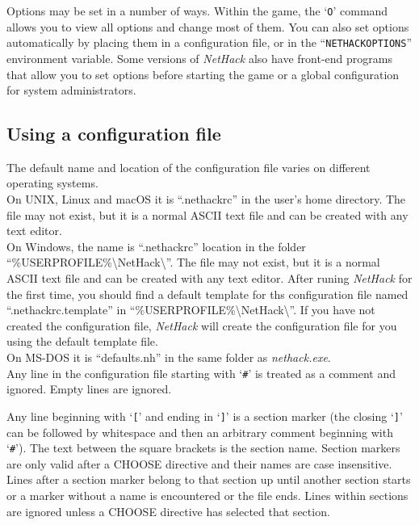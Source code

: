 Options may be set in a number of ways.  Within the game, the `{\tt O}'
command allows you to view all options and change most of them.
You can also set options automatically by placing them in a configuration
file, or in the ``{\tt NETHACKOPTIONS}'' environment variable.
Some versions of {\it NetHack\/} also have front-end programs that allow
you to set options before starting the game or a global configuration
for system administrators.

\subsection*{Using a configuration file}

The default name and location of the configuration file varies on different
operating systems.\\

On UNIX, Linux and macOS it is \mbox{``.nethackrc''} in the user's home
directory.
The file may not exist, but it is a normal ASCII text file and
can be created with any text editor.\\

On Windows, the name is \mbox{``.nethackrc''} location in the folder
\mbox{{``\%USERPROFILE\%\textbackslash NetHack\textbackslash''}}.
The file may not exist,
but it is a normal ASCII text file and can be created with any
text editor.
After runing {\it NetHack\/} for the first time, you should find a default
template for ths configuration file named \mbox{``.nethackrc.template''} in
\mbox{{``\%USERPROFILE\%\textbackslash NetHack\textbackslash''}}.
If you have not created the configuration file, {\it NetHack\/} will create
the configuration file for you using the default template file.\\

On MS-DOS it is \mbox{``defaults.nh''} in the same folder as
\mbox{{\it nethack.exe\/}}.\\

Any line in the configuration file starting with `{\tt \#}' is treated
as a comment and ignored.
Empty lines are ignored.

Any line beginning with `{\tt \verb+[+}' and ending in `{\tt \verb+]+}'
is a section marker (the closing `{\tt \verb+]+}' can be followed
by whitespace and then an arbitrary comment beginning with `{\tt \#}').
The text between the square brackets is the section name.
Section markers are only valid after a CHOOSE directive and their names
are case insensitive.
Lines after a section marker belong to that section up until another
section starts or a marker without a name is encountered or the file ends.
Lines within sections are ignored unless a CHOOSE directive has selected
that section.

